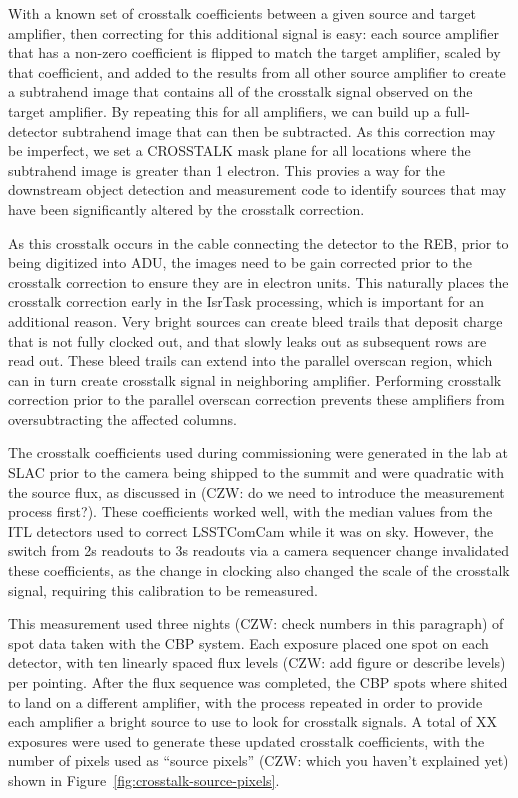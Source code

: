 With a known set of crosstalk coefficients between a given source and target amplifier, then correcting for this additional signal is easy: each source amplifier that has a non-zero coefficient is flipped to match the target amplifier, scaled by that coefficient, and added to the results from all other source amplifier to create a subtrahend image that contains all of the crosstalk signal observed on the target amplifier.
By repeating this for all amplifiers, we can build up a full-detector subtrahend image that can then be subtracted.
As this correction may be imperfect, we set a CROSSTALK mask plane for all locations where the subtrahend image is greater than 1 electron.
This provies a way for the downstream object detection and measurement code to identify sources that may have been significantly altered by the crosstalk correction.

As this crosstalk occurs in the cable connecting the detector to the REB, prior to being digitized into ADU, the images need to be gain corrected prior to the crosstalk correction to ensure they are in electron units.
This naturally places the crosstalk correction early in the IsrTask processing, which is important for an additional reason.
Very bright sources can create bleed trails that deposit charge that is not fully clocked out, and that slowly leaks out as subsequent rows are read out.
These bleed trails can extend into the parallel overscan region, which can in turn create crosstalk signal in neighboring amplifier.
Performing crosstalk correction prior to the parallel overscan correction prevents these amplifiers from oversubtracting the affected columns.

The crosstalk coefficients used during commissioning were generated in the lab at SLAC prior to the camera being shipped to the summit and were quadratic with the source flux, as discussed in \citet{snyder_et_al_2021} (CZW: do we need to introduce the measurement process first?).
These coefficients worked well, with the median values from the ITL detectors used to correct LSSTComCam while it was on sky.
However, the switch from 2s readouts to 3s readouts via a camera sequencer change invalidated these coefficients, as the change in clocking also changed the scale of the crosstalk signal, requiring this calibration to be remeasured.

This measurement used three nights (CZW: check numbers in this paragraph) of spot data taken with the CBP system.
Each exposure placed one spot on each detector, with ten linearly spaced flux levels (CZW: add figure or describe levels) per pointing.
After the flux sequence was completed, the CBP spots where shited to land on a different amplifier, with the process repeated in order to provide each amplifier a bright source to use to look for crosstalk signals.
A total of XX exposures were used to generate these updated crosstalk coefficients, with the number of pixels used as ``source pixels'' (CZW: which you haven't explained yet) shown in Figure~\ref{fig:crosstalk-source-pixels}.

